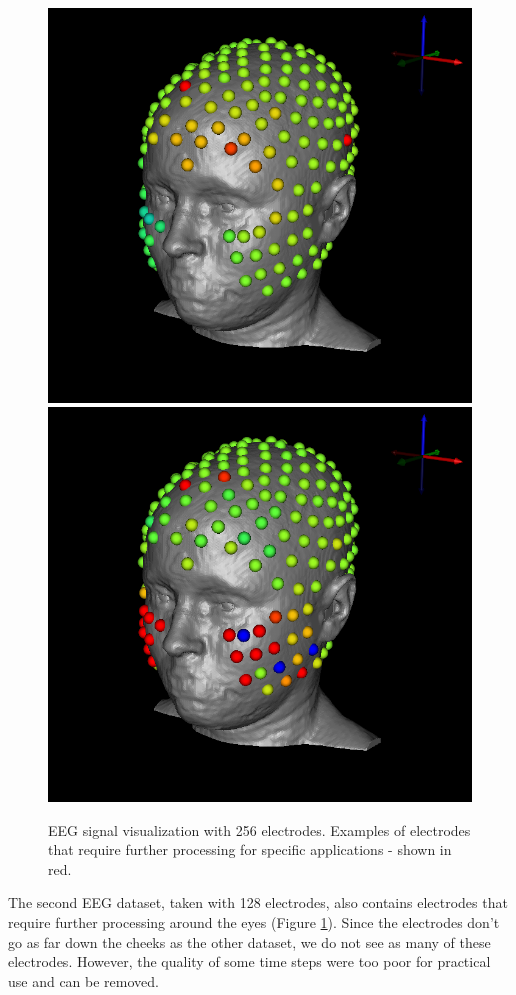 \begin{figure}[H]
\begin{center}
\includegraphics[width=.49\textwidth]{Figures/eeg_1}
\includegraphics[width=.49\textwidth]{Figures/eeg_2}
\caption{EEG signal visualization with 256 electrodes. Examples of electrodes that require further processing for specific applications - shown in red.}
\label{fig:eegvis}
\end{center}
\end{figure}

The second EEG dataset, taken with 128 electrodes, also contains electrodes that require further processing around the eyes (Figure \ref{fig:eegvis}). Since the electrodes don't go as far down the cheeks as the other dataset, we do not see as many of these electrodes. However, the quality of some time steps were too poor for practical use and can be removed.

